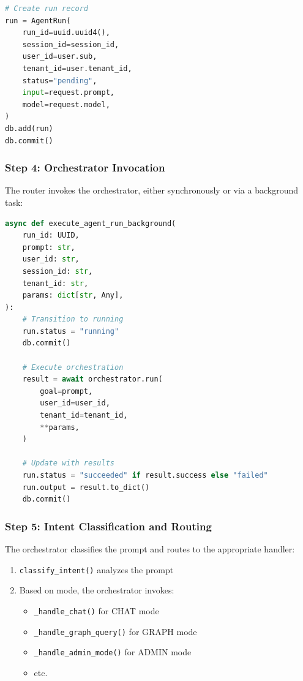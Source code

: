 \begin{lstlisting}[language=Python, caption={Run creation in router}, label=lst:run-creation]
# Create run record
run = AgentRun(
    run_id=uuid.uuid4(),
    session_id=session_id,
    user_id=user.sub,
    tenant_id=user.tenant_id,
    status="pending",
    input=request.prompt,
    model=request.model,
)
db.add(run)
db.commit()
\end{lstlisting}

\subsubsection{Step 4: Orchestrator Invocation}

The router invokes the orchestrator, either synchronously or via a background task:

\begin{lstlisting}[language=Python, caption={Orchestrator invocation}, label=lst:orch-invoke]
async def execute_agent_run_background(
    run_id: UUID,
    prompt: str,
    user_id: str,
    session_id: str,
    tenant_id: str,
    params: dict[str, Any],
):
    # Transition to running
    run.status = "running"
    db.commit()
    
    # Execute orchestration
    result = await orchestrator.run(
        goal=prompt,
        user_id=user_id,
        tenant_id=tenant_id,
        **params,
    )
    
    # Update with results
    run.status = "succeeded" if result.success else "failed"
    run.output = result.to_dict()
    db.commit()
\end{lstlisting}

\subsubsection{Step 5: Intent Classification and Routing}

The orchestrator classifies the prompt and routes to the appropriate handler:

\begin{enumerate}
    \item \texttt{classify\_intent()} analyzes the prompt
    \item Based on mode, the orchestrator invokes:
    \begin{itemize}
        \item \texttt{\_handle\_chat()} for CHAT mode
        \item \texttt{\_handle\_graph\_query()} for GRAPH mode
        \item \texttt{\_handle\_admin\_mode()} for ADMIN mode
        \item etc.
    \end{itemize}
\end{enumerate}

